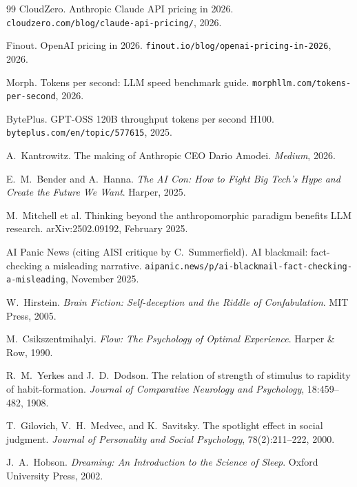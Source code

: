 \documentclass[11pt]{article}
\begin{document}
\begin{thebibliography}{99}
CloudZero.
\newblock Anthropic Claude API pricing in 2026.
\newblock \texttt{cloudzero.com/blog/claude-api-pricing/}, 2026.

Finout.
\newblock OpenAI pricing in 2026.
\newblock \texttt{finout.io/blog/openai-pricing-in-2026}, 2026.

Morph.
\newblock Tokens per second: LLM speed benchmark guide.
\newblock \texttt{morphllm.com/tokens-per-second}, 2026.

BytePlus.
\newblock GPT-OSS 120B throughput tokens per second H100.
\newblock \texttt{byteplus.com/en/topic/577615}, 2025.

A.~Kantrowitz.
\newblock The making of Anthropic CEO Dario Amodei.
\newblock \emph{Medium}, 2026.

E.~M.~Bender and A.~Hanna.
\newblock \emph{The AI Con: How to Fight Big Tech's Hype and Create
the Future We Want}.
\newblock Harper, 2025.

M.~Mitchell et al.
\newblock Thinking beyond the anthropomorphic paradigm benefits LLM
research.
\newblock arXiv:2502.09192, February 2025.

AI Panic News (citing AISI critique by C.~Summerfield).
\newblock AI blackmail: fact-checking a misleading narrative.
\newblock \texttt{aipanic.news/p/ai-blackmail-fact-checking-a-misleading},
November 2025.

W.~Hirstein.
\newblock \emph{Brain Fiction: Self-deception and the Riddle of
Confabulation}.
\newblock MIT Press, 2005.

M.~Csikszentmihalyi.
\newblock \emph{Flow: The Psychology of Optimal Experience}.
\newblock Harper \& Row, 1990.

R.~M.~Yerkes and J.~D.~Dodson.
\newblock The relation of strength of stimulus to rapidity of
habit-formation.
\newblock \emph{Journal of Comparative Neurology and Psychology},
18:459--482, 1908.

T.~Gilovich, V.~H.~Medvec, and K.~Savitsky.
\newblock The spotlight effect in social judgment.
\newblock \emph{Journal of Personality and Social Psychology},
78(2):211--222, 2000.

J.~A.~Hobson.
\newblock \emph{Dreaming: An Introduction to the Science of Sleep}.
\newblock Oxford University Press, 2002.


\end{thebibliography}
\end{document}
